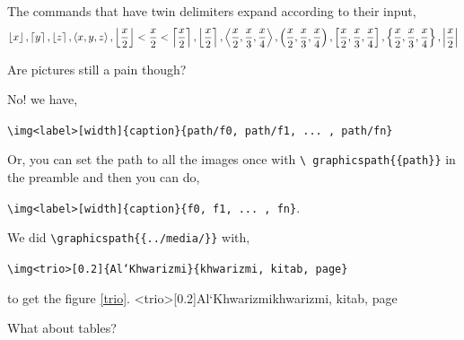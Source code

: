 \documentclass{homework}
\newcommand*{\bk}{\textbackslash}
\renewcommand\tt[1]{\texttt{#1}}
\begin{document}
\begin{sol}
  The commands that have twin delimiters expand according to their input,
  \[
    \left\lfloor x\right\rfloor, \left\lceil y\right\rceil, \left\lfloor z\right\rceil, \left\langle x,y,z\right\rangle,
    \left\lfloor\frac{x}{2}\right\rfloor < \frac{x}{2} < \left\lceil\frac{x}{2}\right\rceil,
    \left\lfloor\frac{x}{2}\right\rceil,
    \left\langle\frac{x}{2}, \frac{x}{3}, \frac{x}{4}\right\rangle,
    \left(\frac{x}{2}, \frac{x}{3}, \frac{x}{4}\right),
    \left[\frac{x}{2}, \frac{x}{3}, \frac{x}{4}\right],
    \left\{\frac{x}{2}, \frac{x}{3}, \frac{x}{4}\right\},
    \left|\frac{x}{2}\right|
  \]
\end{sol}

\question Are pictures still a pain though?

\begin{sol}
  No! we have,
  \begin{center}
    \tt{\bk img<label>[width]\{caption\}\{path/f0, path/f1, ... , path/fn\}}
  \end{center}
  Or, you can set the path to all the images once with \tt{\bk
    graphicspath\{\{path\}\}} in the preamble and then you can do,
  \begin{center}
    \tt{\bk img<label>[width]\{caption\}\{f0, f1, ... , fn\}}.
  \end{center}
  We did \tt{\bk graphicspath\{\{../media/\}\}} with,
  \begin{center}
    \tt{\bk img<trio>[0.2]\{Al`Khwarizmi\}\{khwarizmi, kitab, page\}}
  \end{center}
  to get the figure \ref{trio}.
  \img<trio>[0.2]{Al`Khwarizmi}{khwarizmi, kitab, page}
\end{sol}

\question What about tables?
\end{document}
